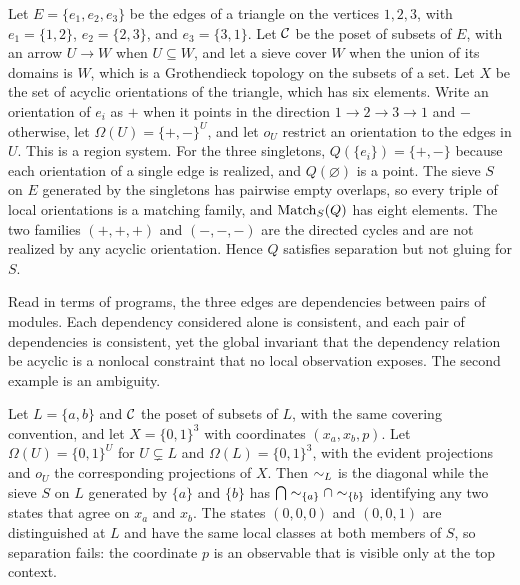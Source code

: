 \begin{example}\label{ex:triangle}
Let $E=\{e_1,e_2,e_3\}$ be the edges of a triangle on the vertices $1,2,3$, with $e_1=\{1,2\}$, $e_2=\{2,3\}$, and $e_3=\{3,1\}$. Let $\mathcal C$ be the poset of subsets of $E$, with an arrow $U\to W$ when $U\subseteq W$, and let a sieve cover $W$ when the union of its domains is $W$, which is a Grothendieck topology on the subsets of a set. Let $X$ be the set of acyclic orientations of the triangle, which has six elements. Write an orientation of $e_i$ as $+$ when it points in the direction $1\to2\to3\to1$ and $-$ otherwise, let $\Omega(U)=\{+,-\}^U$, and let $o_U$ restrict an orientation to the edges in $U$. This is a region system. For the three singletons, $Q(\{e_i\})=\{+,-\}$ because each orientation of a single edge is realized, and $Q(\varnothing)$ is a point. The sieve $S$ on $E$ generated by the singletons has pairwise empty overlaps, so every triple of local orientations is a matching family, and $\operatorname{Match}_S(Q)$ has eight elements. The two families $(+,+,+)$ and $(-,-,-)$ are the directed cycles and are not realized by any acyclic orientation. Hence $Q$ satisfies separation but not gluing for $S$.
\end{example}

Read in terms of programs, the three edges are dependencies between pairs of modules. Each dependency considered alone is consistent, and each pair of dependencies is consistent, yet the global invariant that the dependency relation be acyclic is a nonlocal constraint that no local observation exposes. The second example is an ambiguity.

\begin{example}\label{ex:parity}
Let $L=\{a,b\}$ and $\mathcal C$ the poset of subsets of $L$, with the same covering convention, and let $X=\{0,1\}^3$ with coordinates $(x_a,x_b,p)$. Let $\Omega(U)=\{0,1\}^U$ for $U\subsetneq L$ and $\Omega(L)=\{0,1\}^3$, with the evident projections and $o_U$ the corresponding projections of $X$. Then $\sim_L$ is the diagonal while the sieve $S$ on $L$ generated by $\{a\}$ and $\{b\}$ has $\bigcap\sim_{\{a\}}\cap\sim_{\{b\}}$ identifying any two states that agree on $x_a$ and $x_b$. The states $(0,0,0)$ and $(0,0,1)$ are distinguished at $L$ and have the same local classes at both members of $S$, so separation fails: the coordinate $p$ is an observable that is visible only at the top context.
\end{example}

